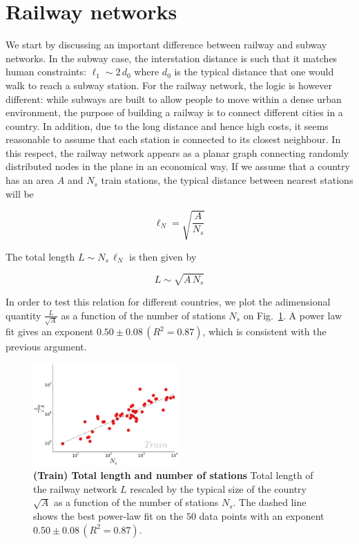 \section{Railway networks}

We start by discussing an important difference between railway and subway
networks. In the subway case, the interstation distance is such that it matches
human constraints: $\ell_1\sim 2\,d_0$ where $d_0$ is the typical distance that
one would walk to reach a subway station. For the railway network, the logic is
however different: while subways are built to allow people to move within a
dense urban environment, the purpose of building a railway is to connect
different cities in a country. In addition, due to the long distance and hence
high costs, it seems reasonable to assume that each station is connected to its
closest neighbour. In this respect, the railway network appears as a planar
graph connecting randomly distributed nodes in the plane in an economical way.
If we assume that a country has an area $A$ and $N_s$ train stations, the
typical distance between nearest stations will be

\begin{equation} 
    \ell_N = \sqrt{\frac{A}{N_s}} 
\end{equation}

The total length $L \sim N_s\,\ell_N$ is then given by

\begin{equation} 
    L \sim \sqrt{A\, N_s} 
\end{equation} 

In order to test this relation for different countries, we plot the adimensional
quantity $\frac{L}{\sqrt{A}}$ as a function of the number of stations $N_s$ on
Fig.~\ref{fig:length-stations}. 
 A power law fit gives an exponent $0.50 \pm 0.08\,(R^2 = 0.87)$, which is
 consistent with the previous argument.

\begin{figure}
    \centering
    \includegraphics[width=0.5\textwidth]{gfx/chapter-networks/rail_length_stations.pdf}
    \caption{{\bf (Train) Total length and number of stations} Total length of
the railway network $L$ rescaled by the typical size of the country $\sqrt{A}$
as a function of the number of stations $N_s$. The dashed line shows the best
power-law fit on the $50$ data points with an exponent $0.50 \pm 0.08\,(R^2 =
0.87)$.\label{fig:length-stations}} 
\end{figure}

